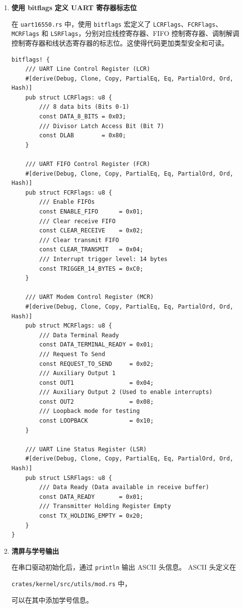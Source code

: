 \documentclass{SYSUReport}
\begin{document}
\begin{enumerate}[label=\arabic*.]
    \item \textbf{使用 bitflags 定义 UART 寄存器标志位}

    在 \texttt{uart16550.rs} 中，使用 \texttt{bitflags} 宏定义了 \texttt{LCRFlags}、\texttt{FCRFlags}、\texttt{MCRFlags} 和 \texttt{LSRFlags}，分别对应线控寄存器、FIFO 控制寄存器、调制解调控制寄存器和线状态寄存器的标志位。这使得代码更加类型安全和可读。

    \begin{verbatim}
bitflags! {
    /// UART Line Control Register (LCR)
    #[derive(Debug, Clone, Copy, PartialEq, Eq, PartialOrd, Ord, Hash)]
    pub struct LCRFlags: u8 {
        /// 8 data bits (Bits 0-1)
        const DATA_8_BITS = 0x03;
        /// Divisor Latch Access Bit (Bit 7)
        const DLAB        = 0x80;
    }

    /// UART FIFO Control Register (FCR)
    #[derive(Debug, Clone, Copy, PartialEq, Eq, PartialOrd, Ord, Hash)]
    pub struct FCRFlags: u8 {
        /// Enable FIFOs
        const ENABLE_FIFO      = 0x01;
        /// Clear receive FIFO
        const CLEAR_RECEIVE    = 0x02;
        /// Clear transmit FIFO
        const CLEAR_TRANSMIT   = 0x04;
        /// Interrupt trigger level: 14 bytes
        const TRIGGER_14_BYTES = 0xC0;
    }

    /// UART Modem Control Register (MCR)
    #[derive(Debug, Clone, Copy, PartialEq, Eq, PartialOrd, Ord, Hash)]
    pub struct MCRFlags: u8 {
        /// Data Terminal Ready
        const DATA_TERMINAL_READY = 0x01;
        /// Request To Send
        const REQUEST_TO_SEND     = 0x02;
        /// Auxiliary Output 1
        const OUT1                = 0x04;
        /// Auxiliary Output 2 (Used to enable interrupts)
        const OUT2                = 0x08;
        /// Loopback mode for testing
        const LOOPBACK            = 0x10;
    }

    /// UART Line Status Register (LSR)
    #[derive(Debug, Clone, Copy, PartialEq, Eq, PartialOrd, Ord, Hash)]
    pub struct LSRFlags: u8 {
        /// Data Ready (Data available in receive buffer)
        const DATA_READY       = 0x01;
        /// Transmitter Holding Register Empty
        const TX_HOLDING_EMPTY = 0x20;
    }
}
    \end{verbatim}

    \item \textbf{清屏与学号输出}

    在串口驱动初始化后，通过 \texttt{println} 输出 ASCII 头信息。
    ASCII 头定义在
    {\raggedright\texttt{crates/kernel/src/utils/mod.rs} 中，\par}
    可以在其中添加学号信息。


\end{enumerate}
\end{document}
